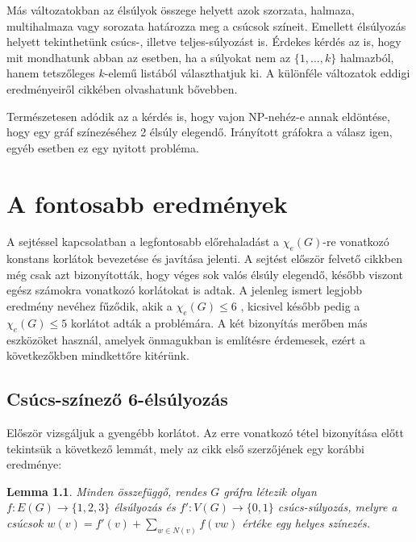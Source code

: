 \documentclass[12pt, a4paper]{report}
\newtheorem{lem}[tét]{Lemma}
\theoremstyle{remark}
\theoremstyle{definition}
\begin{document}
Más változatokban az élsúlyok összege helyett azok szorzata, halmaza, multihalmaza vagy sorozata határozza meg a csúcsok színeit. Emellett élsúlyozás helyett tekinthetünk csúcs-, illetve teljes-súlyozást is. Érdekes kérdés az is, hogy mit mondhatunk abban az esetben, ha a súlyokat nem az $\lbrace 1, \ldots, k \rbrace$ halmazból, hanem tetszőleges $k$-elemű listából választhatjuk ki. A különféle változatok eddigi eredményeiről \citeauthor{Seamone2012} \cite{Seamone2012} cikkében olvashatunk bővebben.

Természetesen adódik az a kérdés is, hogy vajon NP-nehéz-e annak eldöntése, hogy egy gráf színezéséhez 2 élsúly elegendő. Irányított gráfokra a válasz igen, egyéb esetben ez egy nyitott probléma.

\chapter{A fontosabb eredmények}

A sejtéssel kapcsolatban a legfontosabb előrehaladást a $\chi_e(G)$-re vonatkozó konstans korlátok bevezetése és javítása jelenti. A sejtést először felvető cikkben még csak azt bizonyították, hogy véges sok valós élsúly elegendő, később viszont egész számokra vonatkozó korlátokat is adtak. A jelenleg ismert legjobb eredmény \citeauthor{Kalkowski2010} nevéhez fűződik, akik a $\chi_e(G) \leq 6$ \cite{Kalkowski2009}, kicsivel később pedig a $\chi_e(G) \leq 5$ \cite{Kalkowski2010} korlátot adták a problémára. A két bizonyítás merőben más eszközöket használ, amelyek önmagukban is említésre érdemesek, ezért a következőkben mindkettőre kitérünk.

\section{Csúcs-színező 6-élsúlyozás}
Először vizsgáljuk a gyengébb korlátot. Az erre vonatkozó tétel bizonyítása előtt tekintsük a következő lemmát, mely az \cite{Kalkowski2009} cikk első szerzőjének egy korábbi eredménye:

\begin{lem}
Minden összefüggő, rendes $G$ gráfra létezik olyan $f:E(G) \rightarrow \lbrace 1, 2, 3 \rbrace$ élsúlyozás és $f':V(G) \rightarrow \lbrace 0, 1 \rbrace$ csúcs-súlyozás, melyre a csúcsok $w(v) = f'(v) + \sum\limits_{w \in N(v)} f(vw)$ értéke egy helyes színezés.
\end{lem}
\end{document}
